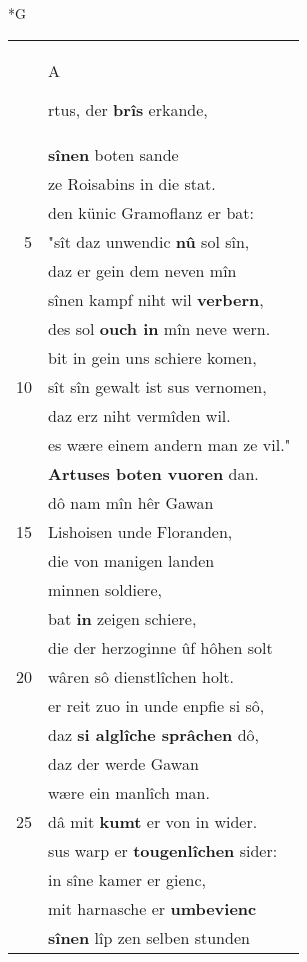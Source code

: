 \documentclass[8pt,a4paper,notitlepage]{article}
\begin{document}
\begin{table}[ht]
\begin{minipage}[t]{0.5\linewidth}
\small
\begin{center}*G
\end{center}
\begin{tabular}{rl}
 & \begin{large}A\end{large}rtus, der \textbf{brîs} erkande,\\ 
 & \textbf{sînen} boten sande\\ 
 & ze Roisabins in die stat.\\ 
 & den künic Gramoflanz er bat:\\ 
5 & "sît daz unwendic \textbf{nû} sol sîn,\\ 
 & daz er gein dem neven mîn\\ 
 & sînen kampf niht wil \textbf{verbern},\\ 
 & des sol \textbf{ouch in} mîn neve wern.\\ 
 & bit in gein uns schiere komen,\\ 
10 & sît sîn gewalt ist sus vernomen,\\ 
 & daz erz niht vermîden wil.\\ 
 & es wære einem andern man ze vil."\\ 
 & \textbf{Artuses boten vuoren} dan.\\ 
 & dô nam mîn hêr Gawan\\ 
15 & Lishoisen unde Floranden,\\ 
 & die von manigen landen\\ 
 & minnen soldiere,\\ 
 & bat \textbf{in} zeigen schiere,\\ 
 & die der herzoginne ûf hôhen solt\\ 
20 & wâren sô dienstlîchen holt.\\ 
 & er reit zuo in unde enpfie si sô,\\ 
 & daz \textbf{si alglîche sprâchen} dô,\\ 
 & daz der werde Gawan\\ 
 & wære ein manlîch man.\\ 
25 & dâ mit \textbf{kumt} er von in wider.\\ 
 & sus warp er \textbf{tougenlîchen} sider:\\ 
 & in sîne kamer er gienc,\\ 
 & mit harnasche er \textbf{umbevienc}\\ 
 & \textbf{sînen} lîp zen selben stunden\\ 

\end{tabular}
\end{minipage}
\end{table}
\end{document}
